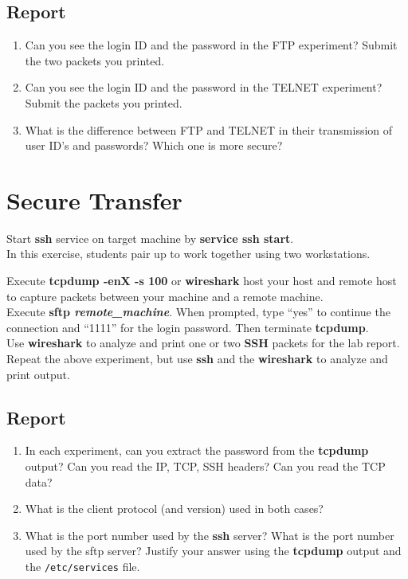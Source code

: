 \documentclass[10pt,a4paper]{article}
\numberwithin{equation}{section}
\numberwithin{figure}{section}
\numberwithin{table}{section}
\begin{document}
	\subsection*{Report}
	\begin{enumerate}
		\item Can you see the login ID and the password in the FTP experiment? Submit the two packets you printed.
		\item Can you see the login ID and the password in the TELNET experiment? Submit the packets you printed.
		\item What is the difference between FTP and TELNET in their transmission of user ID’s and passwords? Which one is more secure?
	\end{enumerate}

\section{Secure Transfer}
	Start \textbf{ssh} service on target machine by \textbf{service ssh start}.\\
		In this exercise, students pair up to work together using two workstations.
	
	Execute \textbf{tcpdump -enX -s 100} or \textbf{wireshark} host your host and remote host to capture packets between your machine and a remote machine.\\
	Execute \textbf{sftp \textit{remote\_machine}}. When prompted, type “yes” to continue the connection and “1111” for the login password. Then terminate \textbf{tcpdump}.\\
	Use \textbf{wireshark} to analyze and print one or two \textbf{SSH} packets for the lab report.\\
	Repeat the above experiment, but use \textbf{ssh} and the \textbf{wireshark} to analyze and print output.\\

	\subsection*{Report}
	\begin{enumerate}
		\item In each experiment, can you extract the password from the \textbf{tcpdump} output? Can you read the IP, TCP, SSH headers? Can you read the TCP data?
		\item What is the client protocol (and version) used in both cases?
		\item What is the port number used by the \textbf{ssh} server? What is the port number used by the sftp server? Justify your answer using the \textbf{tcpdump} output and the \texttt{/etc/services} file.
	\end{enumerate}
\end{document}
